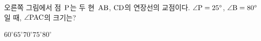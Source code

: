 \noindent\begin{minipage}[t]{0.58\linewidth}\vspace{0pt}\raggedright 오른쪽 그림에서 점~$\mathrm{P}$는 두 현~$\mathrm{AB}$, $\mathrm{CD}$의 연장선의 교점이다. $\angle\mathrm{P}=25^\circ$, $\angle\mathrm{B}=80^\circ$일 때, $\angle\mathrm{PAC}$의 크기는?\end{minipage}\hfill\begin{minipage}[t]{0.4\linewidth}\vspace{0pt}\centering \resizebox{\ifdim\width>\linewidth\linewidth\else\width\fi}{!}{}\end{minipage}\par
\begin{choices32}{$60^\circ$}{$65^\circ$}{$70^\circ$}{$75^\circ$}{$80^\circ$}\end{choices32}
